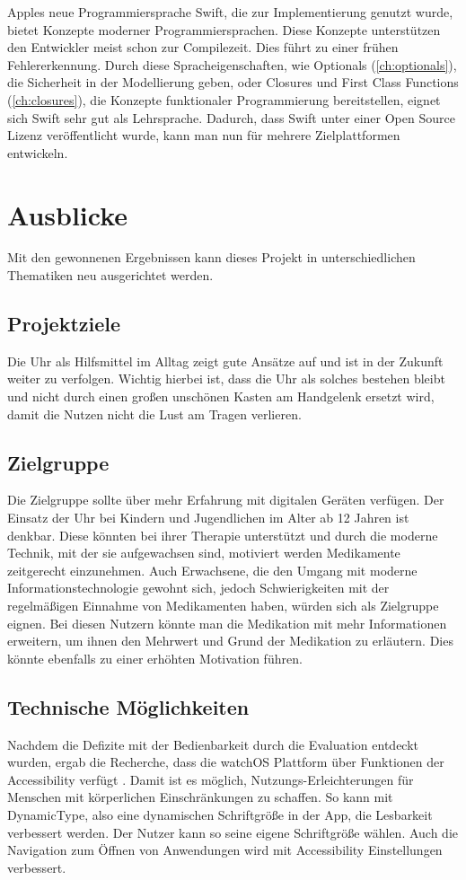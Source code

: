 Apples neue Programmiersprache Swift, die zur Implementierung genutzt wurde, bietet Konzepte moderner Programmiersprachen. Diese Konzepte unterstützen den Entwickler meist schon zur Compilezeit. Dies führt zu einer frühen Fehlererkennung. Durch diese Spracheigenschaften, wie Optionals (\ref{ch:optionals}), die Sicherheit in der Modellierung geben, oder Closures und First Class Functions (\ref{ch:closures}), die Konzepte funktionaler Programmierung bereitstellen, eignet sich Swift sehr gut als Lehrsprache. Dadurch, dass Swift unter einer Open Source Lizenz veröffentlicht wurde, kann man nun für mehrere Zielplattformen entwickeln.

\section{Ausblicke}
Mit den gewonnenen Ergebnissen kann dieses Projekt in unterschiedlichen Thematiken neu ausgerichtet werden. 
\subsection*{Projektziele}
Die Uhr als Hilfsmittel im Alltag zeigt gute Ansätze auf und ist in der Zukunft weiter zu verfolgen. Wichtig hierbei ist, dass die Uhr als solches bestehen bleibt und nicht durch einen großen unschönen Kasten am Handgelenk ersetzt wird, damit die Nutzen nicht die Lust am Tragen verlieren.

\subsection*{Zielgruppe}
Die Zielgruppe sollte über mehr Erfahrung mit digitalen Geräten verfügen. Der Einsatz der Uhr bei Kindern und Jugendlichen im Alter ab 12 Jahren ist denkbar. Diese könnten bei ihrer Therapie unterstützt und durch die moderne Technik, mit der sie aufgewachsen sind, motiviert werden Medikamente zeitgerecht einzunehmen. Auch Erwachsene, die den Umgang mit moderne Informationstechnologie gewohnt sich, jedoch Schwierigkeiten mit der regelmäßigen Einnahme von Medikamenten haben, würden sich als Zielgruppe eignen. Bei diesen Nutzern könnte man die Medikation mit mehr Informationen erweitern, um ihnen den Mehrwert und Grund der Medikation zu erläutern. Dies könnte ebenfalls zu einer erhöhten Motivation führen.

\subsection*{Technische Möglichkeiten}
Nachdem die Defizite mit der Bedienbarkeit durch die Evaluation entdeckt wurden, ergab die Recherche, dass die watchOS Plattform über Funktionen der Accessibility verfügt \cite{Apple:watchAccess} . Damit ist es möglich, Nutzungs-Erleichterungen für Menschen mit körperlichen Einschränkungen zu schaffen. So kann mit DynamicType, also eine dynamischen Schriftgröße in der App, die Lesbarkeit verbessert werden. Der Nutzer kann so seine eigene Schriftgröße wählen. Auch die Navigation zum Öffnen von Anwendungen wird mit Accessibility Einstellungen verbessert.

